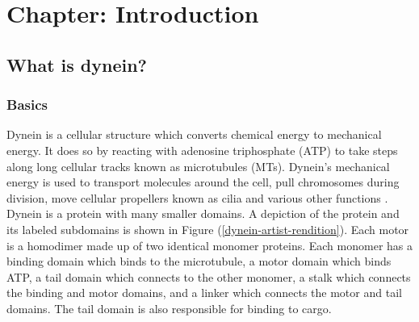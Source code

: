 \documentclass[10pt]{article} %
\begin{document}
\tableofcontents
\newpage

\section{Chapter: Introduction}


\subsection{What is dynein?}
\subsubsection{Basics}

Dynein is a cellular structure which converts chemical energy to mechanical energy. It does so by reacting with adenosine triphosphate (ATP) to take steps along long cellular tracks known as microtubules (MTs). Dynein's mechanical energy is used to transport molecules around the cell, pull chromosomes during division, move cellular propellers known as cilia and various other functions \cite{cianfroccoreview}.\\

Dynein is a protein with many smaller domains. A depiction of the protein and its labeled subdomains is shown in Figure (\ref{dynein-artist-rendition}). Each motor is a homodimer made up of two identical monomer proteins. Each monomer has a binding domain which binds to the microtubule, a motor domain which binds ATP, a tail domain which connects to the other monomer, a stalk which connects the binding and motor domains, and a linker which connects the motor and tail domains. The tail domain is also responsible for binding to cargo.\\
\end{document}
